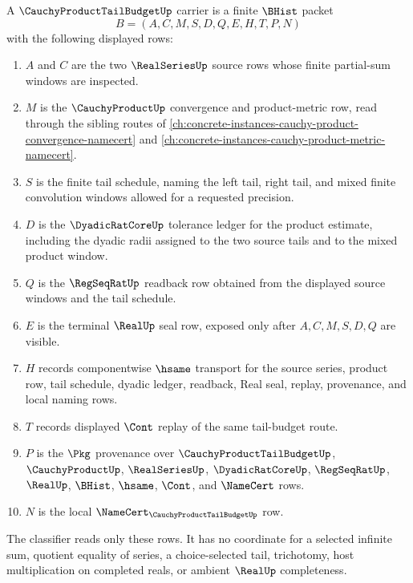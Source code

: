 \begin{definition}
\label{def:cauchy-product-tail-budget-carrier}
A $\CauchyProductTailBudgetUp$ carrier is a finite $\BHist$ packet
$$
B=(A,C,M,S,D,Q,E,H,T,P,N)
$$
with the following displayed rows:
\begin{enumerate}
\item $A$ and $C$ are the two $\RealSeriesUp$ source rows whose finite partial-sum windows are inspected.
\item $M$ is the $\CauchyProductUp$ convergence and product-metric row, read through the sibling routes of \autoref{ch:concrete-instances-cauchy-product-convergence-namecert} and \autoref{ch:concrete-instances-cauchy-product-metric-namecert}.
\item $S$ is the finite tail schedule, naming the left tail, right tail, and mixed finite convolution windows allowed for a requested precision.
\item $D$ is the $\DyadicRatCoreUp$ tolerance ledger for the product estimate, including the dyadic radii assigned to the two source tails and to the mixed product window.
\item $Q$ is the $\RegSeqRatUp$ readback row obtained from the displayed source windows and the tail schedule.
\item $E$ is the terminal $\RealUp$ seal row, exposed only after $A,C,M,S,D,Q$ are visible.
\item $H$ records componentwise $\hsame$ transport for the source series, product row, tail schedule, dyadic ledger, readback, Real seal, replay, provenance, and local naming rows.
\item $T$ records displayed $\Cont$ replay of the same tail-budget route.
\item $P$ is the $\Pkg$ provenance over $\CauchyProductTailBudgetUp$, $\CauchyProductUp$, $\RealSeriesUp$, $\DyadicRatCoreUp$, $\RegSeqRatUp$, $\RealUp$, $\BHist$, $\hsame$, $\Cont$, and $\NameCert$ rows.
\item $N$ is the local $\NameCert_{\CauchyProductTailBudgetUp}$ row.
\end{enumerate}
The classifier reads only these rows. It has no coordinate for a selected infinite sum, quotient equality of series, a choice-selected tail, trichotomy, host multiplication on completed reals, or ambient $\RealUp$ completeness.
\end{definition}

